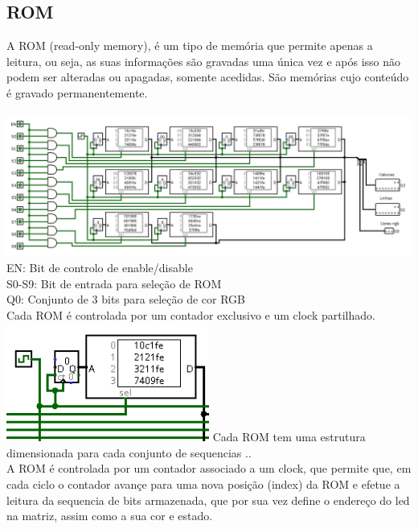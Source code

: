\documentclass[12pt,a4paper,portrait]{article}
\begin{document}
		\subsection{ROM}
			A ROM (read-only memory), é um tipo de memória que permite apenas a leitura, ou seja, as suas informações são gravadas uma única vez e após isso não podem ser alteradas ou apagadas, somente acedidas. São memórias cujo conteúdo é gravado permanentemente.\\\\
			\includegraphics[width=1.0\textwidth]{imagens/romr1}
			EN: Bit de controlo de enable/disable\\
			S0-S9: Bit de entrada para seleção de ROM\\
			Q0: Conjunto de 3 bits para seleção de cor RGB\\
			Cada ROM é controlada por um contador exclusivo e um clock partilhado.\\
			\includegraphics[width=0.5\textwidth]{imagens/rom1}
			Cada ROM tem uma estrutura dimensionada para cada conjunto de sequencias ..\\
			A ROM é controlada por um contador associado a um clock, que permite que, em cada ciclo o contador avançe para uma nova posição (index) da ROM e efetue a leitura da sequencia de bits armazenada, que por sua vez define o endereço do led na matriz, assim como a sua cor e estado.\\
\end{document}
